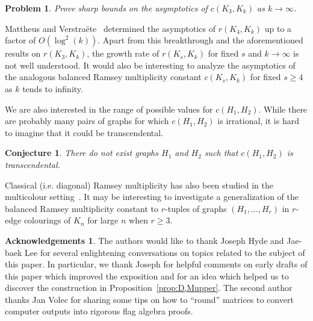 \documentclass[12pt]{article}
\numberwithin{equation}{section}
\newtheorem{conj}[equation]{Conjecture}
\newtheorem{prob}[equation]{Problem}
\theoremstyle{definition}
\newtheorem*{ack}{Acknowledgements}
\theoremstyle{remark}
\begin{document}
\begin{prob}
Prove sharp bounds on the asymptotics of $c(K_3,K_k)$ as $k\to\infty$. 
\end{prob}

Mattheus and Verstra\"ete~\cite{MattheusVerstraete24} determined the asymptotics of $r(K_4,K_k)$ up to a factor of $O(\log^2(k))$. Apart from this breakthrough and the aforementioned results on $r(K_3,K_k)$, the growth rate of $r(K_s,K_k)$ for fixed $s$ and $k\to\infty$ is not well understood. It would also be interesting to analyze the asymptotics of the analogous balanced Ramsey multiplicity constant $c(K_s,K_k)$ for fixed $s\geq4$ as $k$ tends to infinity. 

We are also interested in the range of possible values for $c(H_1,H_2)$. While there are probably many pairs of graphs for which $c(H_1,H_2)$ is irrational, it is hard to imagine that it could be transcendental. 

\begin{conj}
There do not exist graphs $H_1$ and $H_2$ such that $c(H_1,H_2)$ is transcendental.
\end{conj}

Classical (i.e. diagonal) Ramsey multiplicity has also been studied in the multicolour setting~\cite{FoxWigderson23,Cummings+13,JaggerStovicekThomason96,KralVolecWei25,Kral+22}. It may be interesting to investigate a generalization of the balanced Ramsey multiplicity constant to $r$-tuples of graphs $(H_1,\dots,H_r)$ in $r$-edge colourings of $K_n$ for large $n$ when $r\geq3$.


\begin{ack}
The authors would like to thank Joseph Hyde and Jae-baek Lee for several enlightening conversations on topics related to the subject of this paper. In particular, we thank Joseph for helpful comments on early drafts of this paper which improved the exposition and for an idea which helped us to discover the construction in Proposition~\ref{prop:D,Mupper}. The second author thanks Jan Volec for sharing some tips on how to ``round'' matrices to convert computer outputs into rigorous flag algebra proofs.
\end{ack}
\end{document}
